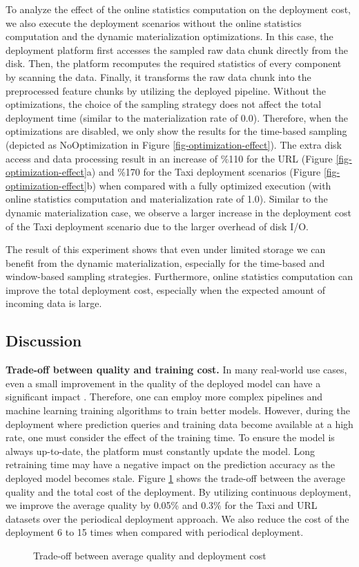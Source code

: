 To analyze the effect of the online statistics computation on the deployment cost, we also execute the deployment scenarios without the online statistics computation and the dynamic materialization optimizations.
In this case, the deployment platform first accesses the sampled raw data chunk directly from the disk.
Then, the platform recomputes the required statistics of every component by scanning the data.
Finally, it transforms the raw data chunk into the preprocessed feature chunks by utilizing the deployed pipeline.
Without the optimizations, the choice of the sampling strategy does not affect the total deployment time (similar to the materialization rate of 0.0).
Therefore, when the optimizations are disabled, we only show the results for the time-based sampling (depicted as NoOptimization in Figure \ref{fig-optimization-effect}).
The extra disk access and data processing result in an increase of \%110 for the URL (Figure \ref{fig-optimization-effect}a) and \%170 for the Taxi deployment scenarios (Figure \ref{fig-optimization-effect}b) when compared with a fully optimized execution (with online statistics computation and materialization rate of 1.0).
Similar to the dynamic materialization case, we observe a larger increase in the deployment cost of the Taxi deployment scenario due to the larger overhead of disk I/O.

The result of this experiment shows that even under limited storage we can benefit from the dynamic materialization, especially for the time-based and window-based sampling strategies.
Furthermore, online statistics computation can improve the total deployment cost, especially when the expected amount of incoming data is large.

\subsection{Discussion} \label{subsec:discussion}
\textbf{Trade-off between quality and training cost.}
In many real-world use cases, even a small improvement in the quality of the deployed model can have a significant impact  \cite{ling2017model}.
Therefore, one can employ more complex pipelines and machine learning training algorithms to train better models.
However, during the deployment where prediction queries and training data become available at a high rate, one must consider the effect of the training time.
To ensure the model is always up-to-date, the platform must constantly update the model.
Long retraining time may have a negative impact on the prediction accuracy as the deployed model becomes stale.
Figure \ref{trade-off-figure} shows the trade-off between the average quality and the total cost of the deployment.
By utilizing continuous deployment, we improve the average quality by 0.05\% and 0.3\% for the Taxi and URL datasets over the periodical deployment approach.
We also reduce the cost of the deployment 6 to 15 times when compared with periodical deployment.
\begin{figure}[!h]
\centering
\resizebox{\columnwidth}{!}{}
\caption{Trade-off between average quality and deployment cost}
\label{trade-off-figure}
\end{figure}

